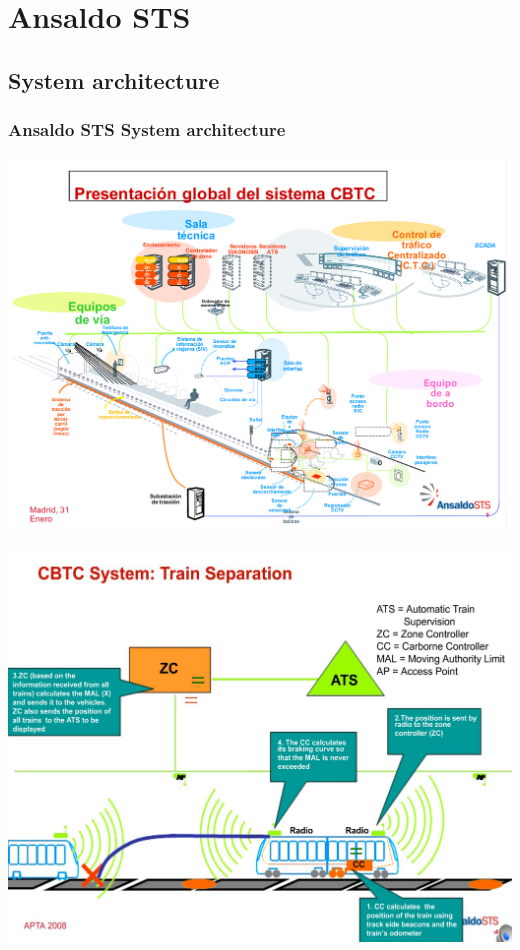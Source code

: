 

\section{Ansaldo STS}
\subsection{System architecture}
\frame
{
  \frametitle{Ansaldo STS System architecture}
 \begin{center}
	\includegraphics[scale=0.4]{./fig/AnsaldoSPsystem}
      \end{center}
   
}

\frame
{
 \begin{center}
	\includegraphics[scale=0.20]{./fig/AnsaldoTrainSepa}
      \end{center}
  
}


